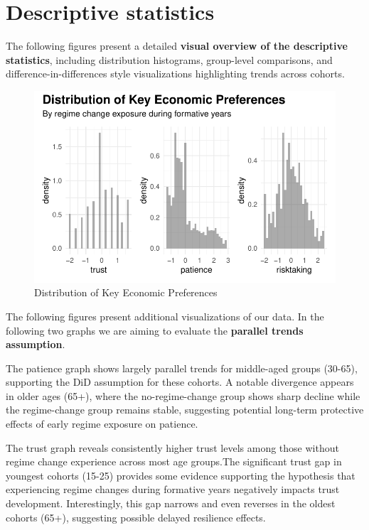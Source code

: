 \documentclass[
  letterpaper,
  DIV=11,
  numbers=noendperiod]{scrartcl}
\begin{document}
\hypertarget{descriptive-statistics}{%
\section{\texorpdfstring{\textbf{Descriptive
statistics}}{Descriptive statistics}}\label{descriptive-statistics}}

The following figures present a detailed \textbf{visual overview of the
descriptive statistics}, including distribution histograms, group-level
comparisons, and difference-in-differences style visualizations
highlighting trends across cohorts.

\begin{figure}[H]

{\centering \includegraphics{Milestone-2-Data_files/figure-pdf/fig-c-1.pdf}

}

\caption{\label{fig-c}Distribution of Key Economic Preferences}

\end{figure}

The following figures present additional visualizations of our data. In
the following two graphs we are aiming to evaluate the \textbf{parallel
trends assumption}.

The patience graph shows largely parallel trends for middle-aged groups
(30-65), supporting the DiD assumption for these cohorts. A notable
divergence appears in older ages (65+), where the no-regime-change group
shows sharp decline while the regime-change group remains stable,
suggesting potential long-term protective effects of early regime
exposure on patience.

The trust graph reveals consistently higher trust levels among those
without regime change experience across most age groups.The significant
trust gap in youngest cohorts (15-25) provides some evidence supporting
the hypothesis that experiencing regime changes during formative years
negatively impacts trust development. Interestingly, this gap narrows
and even reverses in the oldest cohorts (65+), suggesting possible
delayed resilience effects.
\end{document}
